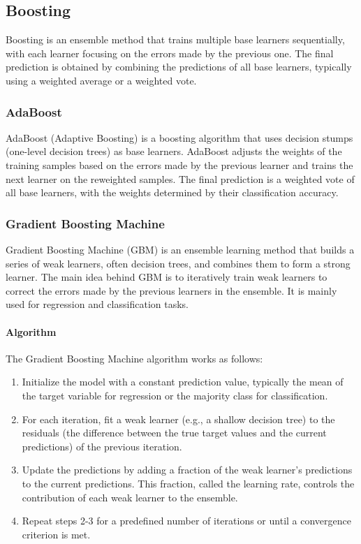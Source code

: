\documentclass[12pt]{article}
\begin{document}
\subsection{Boosting}

Boosting is an ensemble method that trains multiple base learners sequentially, with each learner focusing on the errors made by the previous one. The final prediction is obtained by combining the predictions of all base learners, typically using a weighted average or a weighted vote.

\subsubsection{AdaBoost}

AdaBoost (Adaptive Boosting) is a boosting algorithm that uses decision stumps (one-level decision trees) as base learners. AdaBoost adjusts the weights of the training samples based on the errors made by the previous learner and trains the next learner on the reweighted samples. The final prediction is a weighted vote of all base learners, with the weights determined by their classification accuracy.

\subsubsection{Gradient Boosting Machine}
Gradient Boosting Machine (GBM) is an ensemble learning method that builds a series of weak learners, often decision trees, and combines them to form a strong learner. The main idea behind GBM is to iteratively train weak learners to correct the errors made by the previous learners in the ensemble. It is mainly used for regression and classification tasks.

\paragraph{Algorithm}
The Gradient Boosting Machine algorithm works as follows:
\begin{enumerate}
\item Initialize the model with a constant prediction value, typically the mean of the target variable for regression or the majority class for classification.
\item For each iteration, fit a weak learner (e.g., a shallow decision tree) to the residuals (the difference between the true target values and the current predictions) of the previous iteration.
\item Update the predictions by adding a fraction of the weak learner's predictions to the current predictions. This fraction, called the learning rate, controls the contribution of each weak learner to the ensemble.
\item Repeat steps 2-3 for a predefined number of iterations or until a convergence criterion is met.
\end{enumerate}
\end{document}
